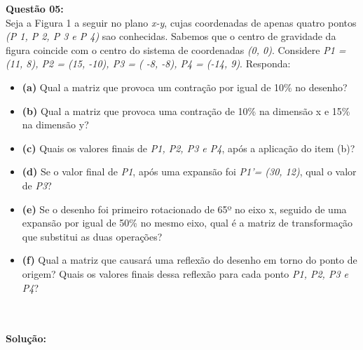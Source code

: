 \documentclass[10pt]{article}
\begin{document}
\vspace{1cm}
\noindent\textbf{Questão 05:}\\
Seja a Figura 1 a seguir no plano \emph{x-y}, cujas coordenadas de apenas quatro pontos \emph{(P 1, P 2, P 3 e P 4)}
sao conhecidas. Sabemos que o centro de gravidade da figura coincide com o centro do sistema
de coordenadas \emph{(0, 0)}. Considere \emph{P1 = (11, 8), P2 = (15, -10), P3 = ( -8, -8), P4 = (-14, 9)}.
Responda:
\begin{itemize}
\item \textbf{(a)} Qual a matriz que provoca um contração por igual de 10\% no desenho?
\item \textbf{(b)} Qual a matriz que provoca uma contração de 10\% na dimensão x e 15\% na dimensão y?
\item \textbf{(c)} Quais os valores finais de \emph{P1, P2, P3 e P4}, após a aplicação do item (b)?
\item \textbf{(d)} Se o valor final de \emph{P1}, após uma expansão foi \emph{P1'= (30, 12)}, qual o valor de \emph{P3}?
\item \textbf{(e)} Se o desenho foi primeiro rotacionado de 65º no eixo x, seguido de uma expansão por igual de 50\% no mesmo eixo, qual é a matriz de transformação que substitui as duas operações?
\item \textbf{(f)} Qual a matriz que causará uma reflexão do desenho em torno do ponto de origem? Quais os
valores finais dessa reflexão para cada ponto \emph{P1, P2, P3 e P4}?
\end{itemize}
\\
\\
\noindent\textbf{Solução:}
\\
\end{document}
